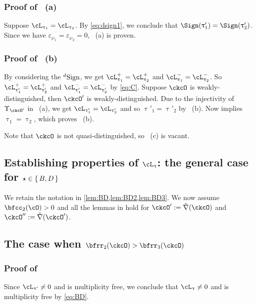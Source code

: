 \documentclass[12pt,a4paper]{amsart}
\def\DD{\nabla}
\numberwithin{equation}{section}
\theoremstyle{remark}
\def\ckDD{{\check\DD}}
\begin{document}
\subsubsection*{Proof of ~(a)}
Suppose $\ac_{\uptau_{1}}=\ac_{\uptau_{2}}$. By \eqref{eq:dsign1},
we conclude that $\Sign(\uptau'_{1})=\Sign(\uptau'_{2})$. Since we have
$\varepsilon_{\wp_{1}}=\varepsilon_{\wp_{2}}=0$, ~(a) is proven.



\subsubsection*{Proof of ~(b)}
By considering the ${}^d\mathrm{Sign}$,  we get $\pac{\uptau_1}=\pac{\uptau_2}$
and $\nac{\uptau_1}=\nac{\uptau_2}$. So $\pac{\uptau'_{1}}=\pac{\uptau'_{2}}$ and
$\nac{\uptau'_{1}}=\nac{\uptau'_{2}}$ by \eqref{eq:C}.
Suppose $\ckcO$ is weakly-distinguished, then $\ckcO'$ is
weakly-distinguished.
Due to the injectivity of $\Upsilon_{\ckcO'}$ in ~(a), we get
$\ac_{\uptau'_{1}}=\ac_{\uptau'_{2}}$ and so $\uptau'_{1}=\uptau'_{2}$ by ~(b).
Now  implies $\uptau_{1}=\uptau_{2}$, which proves ~(b).

\smallskip

Note that $\ckcO$ is not quasi-distinguished, so ~(c) is vacant.


\subsection{Establishing properties of $\ac_{\uptau}$: the general case for $\star\in \set{B,D}$}\label{generalBD}
We retain the notation in \cref{lem:BD,lem:BD2,lem:BD3}.
We now assume $\bfcc_{2}(\cO)>0$ and all the lemmas in 
hold for $\ckcO':=\ckDD(\ckcO)$ and $\ckcO'' := \ckDD(\ckcO')$.



\subsection*{The case when $\bfrr_{2}(\ckcO)>\bfrr_{3}(\ckcO)$}

\subsubsection*{Proof of }

Since $\ac_{\uptau'}\neq 0$ and is multiplicity free, we conclude that $\ac_{\uptau}\neq 0$ and
is multiplicity free by \eqref{eq:BD}.
\end{document}
